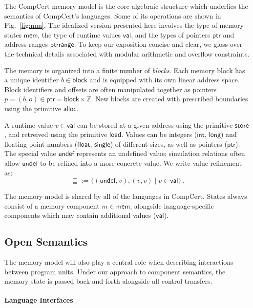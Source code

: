\documentclass[sigplan,10pt,review,anonymous]{acmart}
\newcommand{\kw}[1]{\ensuremath{ \mathsf{#1} }}
\begin{document}
The CompCert memory model \cite{compcertmmv2}
is the core algebraic structure
which underlies the semantics of CompCert's languages.
Some of its operations
are shown in Fig.~\ref{fig:mm}.
The idealized version presented here
involves
the type of memory states \kw{mem},
the type of runtime values \kw{val}, and
the types of pointers \kw{ptr} and address ranges \kw{ptrrange}.
To keep our exposition concise and clear,
we gloss over the technical details
associated with modular arithmetic and overflow constraints.

The memory is organized into a finite number of \emph{blocks}.
Each memory block has a unique identifier $b \in \kw{block}$
and is equipped with its own linear address space.
Block identifiers and offsets are often manipulated together
as pointers $p = (b, o) \in \kw{ptr} = \kw{block} \times \mathbb{Z}$.
New blocks are created with prescribed boundaries
using the primitive $\kw{alloc}$.

A runtime value $v \in \kw{val}$ can be stored at
a given address using the primitive \kw{store},
and retreived using the primitive \kw{load}.
Values can be integers (\kw{int}, \kw{long}) and
floating point numbers (\kw{float}, \kw{single})
of different sizes,
as well as pointers (\kw{ptr}).
The special value \kw{undef}
represents an undefined value;
simulation relations
often allow $\kw{undef}$
to be refined into a more concrete value.
We write value refinement as:
\[
    {\sqsubseteq} := \{(\kw{undef}, v), (v, v) \mid v \in \kw{val}\} \,.
\]

The memory model is shared by all of the languages in CompCert.
States always consist of
a memory component $m \in \kw{mem}$,
alongside language-specific components
which may contain additional values ($\kw{val}$).


\subsection{Open Semantics} \label{sec:sem:open} %

The memory model will also play a central role
when describing interactions between program units.
Under our approach to component semantics,
the memory state is passed back-and-forth
alongside all control transfers.

\paragraph{Language Interfaces} %
\end{document}
